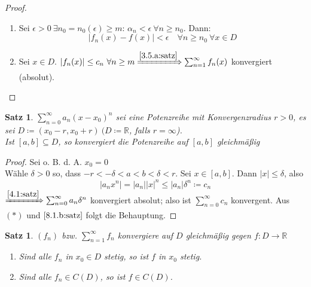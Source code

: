 \documentclass[14pt,titlepage,ngerman,a4paper,headsepline,DIV15,halfparskip*]{scrartcl}
\newcommand{\R}{\mathbb{R}}
\theoremstyle{named}
\theoremstyle{dotless}
\newtheorem{satz}[namedtheorem]{Satz}
\begin{document}
\begin{proof} ~\
	\begin{enumerate}
		\item Sei $\epsilon > 0 ~\exists n_{0} = n_{0}(\epsilon)\geq m$: $\alpha_{n} < \epsilon ~\forall n \geq n_{0}$. Dann:
			$$ | f_{n}(x) - f(x) | < \epsilon \quad \forall n \geq n_{0} ~\forall x \in D $$
		\item Sei $x \in D$. $|f_{n}(x)| \leq c_{n} ~\forall n \geq m \xRightarrow[]{\ref{3.5.a:satz}} \sum_{n=1}^{\infty} f_{n}(x)$ konvergiert (absolut).
	\end{enumerate}
\end{proof}


\begin{satz} \label{8.2:satz}
	$\sum_{n=0}^{\infty} a_{n} (x - x_{0})^{n}$ sei eine Potenzreihe mit Konvergenzradius $r > 0$, es sei $D \coloneqq (x_{0} - r, x_{0} + r) ~(D \coloneqq \R$, falls $r = \infty$). \\
	Ist $[a, b] \subseteq D$, so konvergiert die Potenzreihe auf $[a, b]$ gleichmä{\ss}ig
\end{satz}

\begin{proof}
	Sei o. B. d. A. $x_{0} = 0$ \\	%
	Wähle $\delta > 0$ so, dass $-r < -\delta <a < b < \delta < r$. Sei $x \in [a, b]$. Dann $|x| \leq \delta$, also
		\[ \left| a_{n} x^{n} \right| = |a_{n}| |x|^{n} \leq |a_{n}| \delta^{n} \coloneqq c_{n} \tag*{$(*)$} \]
	$\xRightarrow[]{\ref{4.1:satz}} \sum_{n=0}^{\infty} a_{n} \delta^{n}$ konvergiert absolut; also ist $\sum_{n=0}^{\infty} c_{n}$ konvergent. Aus $(*)$ und $\ref{8.1.b:satz}$ folgt die Behauptung.
\end{proof}


\begin{satz} \label{8.3:satz}
	$(f_{n})$ bzw. $\sum_{n=1}^{\infty} f_{n}$ konvergiere auf $D$ gleichmä{\ss}ig gegen $f \colon D \rightarrow \R$
	\begin{enumerate}
		\item Sind alle $f_{n}$ in $x_{0} \in D$ stetig, so ist $f$ in $x_{0}$ stetig. \label{8.3.a:satz}
		\item Sind alle $f_{n} \in C(D)$, so ist $f \in C(D)$. \label{8.3.b:satz}
	\end{enumerate}
\end{satz}
\end{document}
